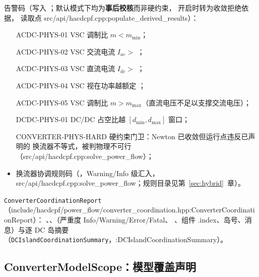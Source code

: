 告警码（写入 ；默认模式下均为\textbf{事后校核}而非硬约束，
 开启时转为收敛拒绝依据，
读取点 src/api/hacdcpf.cpp:populate\_derived\_results）：
\begin{itemize}
  \item [ACDC-PHYS-01] VSC 调制比 $m<m_{\min}$；
  \item [ACDC-PHYS-02] VSC 交流电流 $I_{ac}>$ ；
  \item [ACDC-PHYS-03] VSC 直流电流 $I_{dc}>$ ；
  \item [ACDC-PHYS-04] VSC 视在功率越额定 ；
  \item [ACDC-PHYS-05] VSC 调制比 $m>m_{\max}$（直流电压不足以支撑交流电压）；
  \item [DCDC-PHYS-01] DC/DC 占空比越 $[d_{\min},d_{\max}]$ 窗口；
  \item [CONVERTER-PHYS-HARD] 硬约束门卫：Newton 已收敛但运行点违反已声明的
        换流器不等式，被判物理不可行（src/api/hacdcpf.cpp:solve\_power\_flow）；
  \item 换流器协调规则码（，Warning/Info 级汇入，
        src/api/hacdcpf.cpp:solve\_power\_flow；规则目录见第~\ref{sec:hybrid}~章）。
\end{itemize}
\texttt{ConverterCoordinationReport}（include/hacdcpf/power\_flow/converter\_coordination.hpp:ConverterCoordinationReport）：
、、（严重度 Info/Warning/Error/Fatal、
、组件 .index、岛号、消息）与逐 DC 岛摘要 
（\texttt{DCIslandCoordinationSummary}，:DCIslandCoordinationSummary）。

\subsection{ConverterModelScope：模型覆盖声明}\label{subsec:scope}


